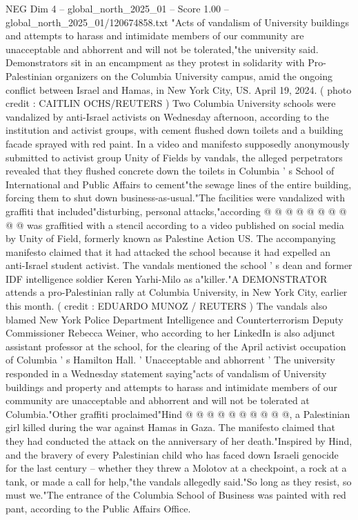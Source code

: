 \begin{textsample}{NEG Dim 4 – global\_north\_2025\_01 – Score 1.00 – global\_north\_2025\_01/120674858.txt}  \label{ex:f4_neg_414}
"Acts of vandalism of University buildings and attempts to harass and intimidate members of our community are unacceptable and abhorrent and will not be tolerated,"the university said.
Demonstrators sit in an encampment as they protest in solidarity with Pro-Palestinian organizers on the Columbia University campus, amid the ongoing conflict between Israel and Hamas, in New York City, US.
April 19, 2024. ( photo credit : CAITLIN OCHS/REUTERS ) Two Columbia University schools were vandalized by anti-Israel activists on Wednesday afternoon, according to the institution and activist groups, with cement flushed down toilets and a building facade sprayed with red paint.
In a video and manifesto supposedly anonymously submitted to activist group Unity of Fields by vandals, the alleged perpetrators revealed that they flushed concrete down the toilets in Columbia ' s School of International and Public Affairs to cement"the sewage lines of the entire building, forcing them to shut down business-as-usual."The facilities were vandalized with graffiti that included"disturbing, personal attacks,"according @ @ @ @ @ @ @ @ @ @ was graffitied with a stencil according to a video published on social media by Unity of Field, formerly known as Palestine Action US.
The accompanying manifesto claimed that it had attacked the school because it had expelled an anti-Israel student activist.
The vandals mentioned the school ' s dean and former IDF intelligence soldier Keren Yarhi-Milo as a"killer."A DEMONSTRATOR attends a pro-Palestinian rally at Columbia University, in New York City, earlier this month. ( credit : EDUARDO MUNOZ / REUTERS ) The vandals also blamed New York Police Department Intelligence and Counterterrorism Deputy Commissioner Rebecca Weiner, who according to her LinkedIn is also adjunct assistant professor at the school, for the clearing of the April activist occupation of Columbia ' s Hamilton Hall. ' Unacceptable and abhorrent ' The university responded in a Wednesday statement saying"acts of vandalism of University buildings and property and attempts to harass and intimidate members of our community are unacceptable and abhorrent and will not be tolerated at Columbia."Other graffiti proclaimed"Hind @ @ @ @ @ @ @ @ @ @, a Palestinian girl killed during the war against Hamas in Gaza.
The manifesto claimed that they had conducted the attack on the anniversary of her death."Inspired by Hind, and the bravery of every Palestinian child who has faced down Israeli genocide for the last century -- whether they threw a Molotov at a checkpoint, a rock at a tank, or made a call for help,"the vandals allegedly said."So long as they resist, so must we."The entrance of the Columbia School of Business was painted with red pant, according to the Public Affairs Office.

\end{textsample}
